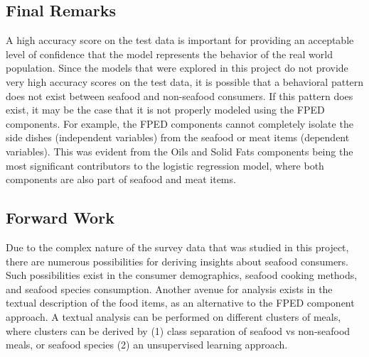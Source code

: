 \documentclass{article}
\begin{document}
\subsection{Final Remarks}
\label{ssec:subhead}

A high accuracy score on the test data is important for providing an acceptable level of confidence that the model represents the behavior of the real world population. Since the models that were explored in this project do not provide very high accuracy scores on the test data, it is possible that a behavioral pattern does not exist between seafood and non-seafood consumers. If this pattern does exist, it may be the case that it is not properly modeled using the FPED components. For example, the FPED components cannot completely isolate the side dishes (independent variables) from the seafood or meat items (dependent variables). This was evident from the Oils and Solid Fats components being the most significant contributors to the logistic regression model, where both components are also part of seafood and meat items. 

\subsection{Forward Work}
\label{ssec:subhead}

Due to the complex nature of the survey data that was studied in this project, there are numerous possibilities for deriving insights about seafood consumers. Such possibilities exist in the consumer demographics, seafood cooking methods, and seafood species consumption. Another avenue for analysis exists in the textual description of the food items, as an alternative to the FPED component approach. A textual analysis can be performed on different clusters of meals, where clusters can be derived by (1) class separation of seafood vs non-seafood meals, or seafood species (2) an unsupervised learning approach. 



\vfill\pagebreak



\end{document}
